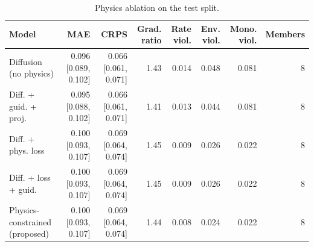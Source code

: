 \begin{table}[t]
\centering
\caption{Physics ablation on the test split.}
\label{tab:ablation}
\scriptsize
\begin{tabular}{lrrrrrrr}
\hline
Model & MAE & CRPS & Grad. ratio & Rate viol. & Env. viol. & Mono. viol. & Members \\
\hline
Diffusion (no physics) & 0.096 [0.089, 0.102] & 0.066 [0.061, 0.071] & 1.43 & 0.014 & 0.048 & 0.081 & 8 \\
Diff. + guid. + proj. & 0.095 [0.088, 0.102] & 0.066 [0.061, 0.071] & 1.41 & 0.013 & 0.044 & 0.081 & 8 \\
Diff. + phys. loss & 0.100 [0.093, 0.107] & 0.069 [0.064, 0.074] & 1.45 & 0.009 & 0.026 & 0.022 & 8 \\
Diff. + loss + guid. & 0.100 [0.093, 0.107] & 0.069 [0.064, 0.074] & 1.45 & 0.009 & 0.026 & 0.022 & 8 \\
Physics-constrained (proposed) & 0.100 [0.093, 0.107] & 0.069 [0.064, 0.074] & 1.44 & 0.008 & 0.024 & 0.022 & 8 \\
\hline
\end{tabular}
\end{table}
